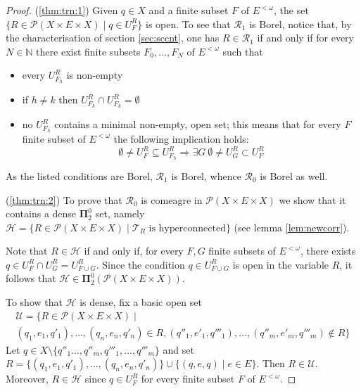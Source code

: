 \documentclass[10pt,a4paper]{amsart}
\newcommand{\N}{\mathbb N}
\newcommand{\bpi}{\boldsymbol\Pi}
\begin{document}
\setcounter{section}{3}
\setcounter{equation}{1}
\setcounter{thm}{18}
\begin{proof}
(\ref{thm:trn:1})  Given $q\in X$ and a finite subset $F$ of $E^{<\omega }$, the set $\{ R\in \mathcal P (X\times E\times X)\mid q\in U_F^R\} $ is open.
To see that $ \mathcal R_1$ is Borel, notice that, by the characterisation of section \ref{sec:sccnt}, one has $R\in \mathcal R_1$ if and only if for every $N\in \N $ there exist finite subsets $F_0,\ldots ,F_N$ of $E^{<\omega }$ such that
\begin{itemize}
\item every $U_{F_h}^R$ is non-empty
\item if $h\ne k$ then $U_{F_h}^R\cap U_{F_k}^R=\emptyset $
\item no $U_{F_h}^R$ contains a minimal non-empty, open set; this means that for every $F$ finite subset of $E^{<\omega }$ the following implication holds:
\[
\emptyset\ne U_F^R\subseteq U_{F_h}^R\Rightarrow\exists G\ \emptyset\ne U_G^R\subset U_F^R
\]
\end{itemize}

As the listed conditions are Borel, $ \mathcal R_1$ is Borel, whence $ \mathcal R_0$ is Borel as well.

(\ref{thm:trn:2}) To prove that $ \mathcal R_0$ is comeagre in $ \mathcal P (X\times E\times X)$ we show that it contains a dense $ \bpi^0_2$ set, namely $ \mathcal H =\{ R\in \mathcal P (X\times E\times X)\mid \mathcal T_R \text{ is hyperconnected} \} $ (see lemma \ref{lem:newcorr}).

Note that $R\in \mathcal H $ if and only if, for every $F,G$ finite subsets of $E^{<\omega }$, there exists $q\in U_F^R\cap U_G^R=U_{F\cup G}^R$.
Since the condition $q\in U_{F\cup G}^R$ is open in the variable $R$, it follows that $ \mathcal H \in \bpi^0_2( \mathcal P (X\times E\times X))$.

To show that $ \mathcal H $ is dense, fix a basic open set
\[ \begin{array}{l}
\mathcal U =\{ R\in \mathcal P (X\times E\times X)\mid \\
(q_1,e_1,q'_1),\ldots ,(q_n,e_n,q'_n)\in R, (q''_1,e'_1,q'''_1),\ldots ,(q''_m,e'_m,q'''_m)\notin R\}
\end{array} \]
Let $q\in X\setminus\{ q''_1\ldots ,q''_m,q'''_1,\ldots ,q'''_m\} $ and set $R=\{ (q_1,e_1,q'_1),\ldots ,(q_n,e_n,q'_n)\}\cup\{ (q,e,q)\mid e\in E\} $.
Then $R\in \mathcal U $.
Moreover, $R\in \mathcal H$ since $q\in U_F^R$ for every finite subset $F$ of $E^{<\omega }$.
\end{proof}
\end{document}

